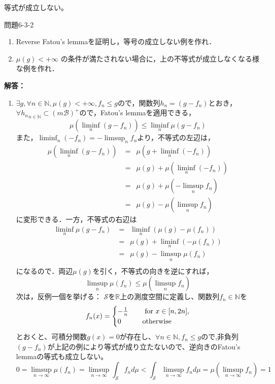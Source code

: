 \documentclass{jsarticle}
\begin{document}
等式が成立しない。
\begin{itembox}[l]{問題6-3-2}
\begin{enumerate}
\item Reverse Fatou's lemmaを証明し，等号の成立しない例を作れ．
\item $\mu(g) < + \infty$ の条件が満たされない場合に，上の不等式が成立しなくなる様な例を作れ．
\end{enumerate}
\end{itembox}
{\bf 解答：}
\begin{enumerate}
\item
$\exists g, \forall n \in \mathbb{N}, \mu(g) < + \infty, f_n \le g$ので，関数列$h_n=(g-f_n)$とおき，$\forall{h_n}_{n\in \mathbb{N}} \subset (m\mathcal{B})^+$ので，Fatou's lemmaを適用できる，
\begin{equation*}
\mu(\liminf_n (g-f_n)) \le \liminf_n \mu(g-f_n)
\end{equation*}
また，$\liminf_n (-f_n) = -\limsup_n f_n$より，不等式の左辺は，
\begin{equation*}
\begin{split}
\mu(\liminf_n (g-f_n)) &=\,\,\, \mu(g + \liminf_n (- f_n)) \\
&=\,\,\, \mu(g)  + \mu(\liminf_n (-f_n))\\
&=\,\,\, \mu(g) + \mu(-\limsup_n f_n)\\
&=\,\,\, \mu(g) - \mu(\limsup_n f_n)
\end{split}
\end{equation*}
に変形できる．一方，不等式の右辺は
\begin{equation*}
\begin{split}
\liminf_n \mu(g-f_n) &=\,\,\, \liminf_n (\mu(g)-\mu(f_n))\\
&=\,\,\, \mu(g) + \liminf_n(-\mu(f_n))\\
&=\,\,\, \mu(g) - \limsup_n \mu(f_n)\\
\end{split}
\end{equation*}
になるので．両辺$\mu(g)$を引く，不等式の向きを逆にすれば，
\begin{equation*}
 \limsup_n \mu(f_n) \le  \mu(\limsup_n f_n)
\end{equation*}
次は，反例一個を挙げる：
$\mathcal{S}$を$\mathbb{R}$上の測度空間に定義し、関数列$f_n\in \mathbb{N}$を
\[
f_n(x) = \begin{cases}
-\frac{1}{n} & \text{\,\,\,\,\,\, for $x \in [n,2n]$}, \\
0 & \text{\,\,\,\,\,\,otherwise}
\end{cases}
\]
とおくと、可積分関数$g(x)=0$が存在し、$\forall n \in \mathbb{N}, f_n \le g$ので,非負列$(g-f_n)$が上記の例により等式が成り立たないので、逆向きのFatou's lemmaの等式も成立しない。
\[
0 = \limsup_{n \to \infty} \mu(f_n) = \limsup_{n \to \infty} \int_{\mathcal{S}} f_n d\mu < \int_{\mathcal{S}} \limsup_{n \to \infty} f_n d\mu = \mu( \limsup_{n \to \infty} f_n) = 1
\]


\end{enumerate}
\end{document}
